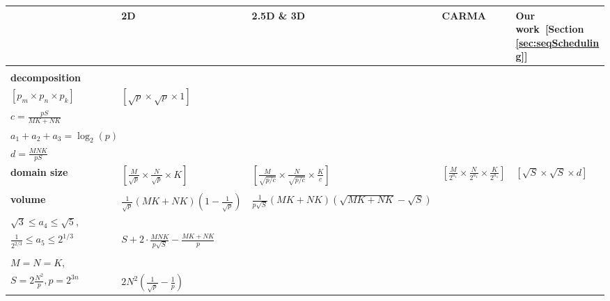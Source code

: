 \documentclass[sigplan,review,anonymous]{acmart}\settopmatter{printfolios=true,printccs=false,printacmref=false}
\begin{document}
\begin{table}
%
\setlength{\tabcolsep}{4pt}
\renewcommand{\arraystretch}{2}
\centering
\scriptsize
\sf
%
\begin{tabular}{lllll}
%
\toprule
%
 & \textbf{2D~\cite{summa}} & \textbf{2.5D \& 3D~\cite{25d}} & 
 \textbf{CARMA~\cite{CARMA}} & \textbf{Our work~[Section 
 \ref{sec:seqScheduling}]} \\
%
\midrule
%
\makecell[l]{\textbf{process}\\
\textbf{decomposition} \\
$\left[p_m \times p_n \times p_k\right]$}
&
$\left[\sqrt{p} \times \sqrt{p} \times 1\right]$
&
\makecell[l]{$\left[\sqrt{p/c} \times \sqrt{p/c} \times c\right]$,\\
$c = \frac{pS}{MK + NK}$}
& 
\makecell[l]{$\left[{2^{a_1}} \times {2^{a_2}} \times {2^{a_3}}\right]$,\\
$a_1 + a_2 + a_3 = \log_2(p)$}
& 
\makecell[l]{$\left[\frac{M}{\sqrt{S}} \times \frac{N}{\sqrt{S}} \times 
\frac{K}{d}\right]$,\\
$d = \frac{MNK}{pS}$}
%
\vspace{1.0em}
%
\\
%
%
\textbf{domain size}
&
$\left[\frac{M}{\sqrt{p}} \times \frac{N}{\sqrt{p}} \times K\right]$ 
&
$\left[\frac{M}{\sqrt{p/c}} \times \frac{N}{\sqrt{p/c}} \times 
\frac{K}{c}\right]$
&
$\left[\frac{M}{2^{a_1}} \times \frac{N}{2^{a_1}} \times 
\frac{K}{2^{a_1}}\right]$
& 
$\left[{\sqrt{S}} \times {\sqrt{S}} \times {d}\right]$
%
\vspace{0.5em}
%
\\
%
\midrule
%
\makecell[l]{\textbf{communication}\\
\textbf{volume}}
&
$\frac{1}{\sqrt{p}} \left(MK + NK\right)\left(1 - \frac{1}{\sqrt{p}}\right)$
&
$\frac{1}{p \sqrt{S}} \left(MK + NK\right)\left(\sqrt{MK + NK} - 
\sqrt{S}\right)$
&
\makecell[l]{$2a_4 \cdot \frac{MNK}{p\sqrt{S}} + a_5 \cdot 
\left(\frac{MNK}{P}\right)^{2/3} - \frac{MK + NK}{p}$, \\
$\sqrt{3}\le a_4 \le \sqrt{5}$,\\
$\frac{1}{2^{2/3}} \le a_5 \le 2^{1/3}$}
& 
$S + 2 \cdot \frac{MNK}{p\sqrt{S}} - \frac{MK + NK}{p}$
%
\vspace{0.5em}
%
\\
%
\midrule
%
\makecell[l]{\textbf{``the easiest case'':}\\
$M = N = K$,\\
$S = 2\frac{N^2}{p}, p=2^{3n}$}
&
$2N^2 \left(\frac{1}{\sqrt{p}} - \frac{1}{p} \right)$

\end{tabular}
\end{table}
\end{document}
